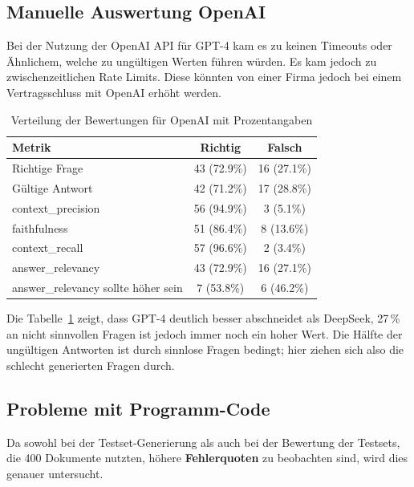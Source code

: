 \subsection{Manuelle Auswertung OpenAI}
Bei der Nutzung der OpenAI API für GPT-4 kam es zu keinen Timeouts oder Ähnlichem, welche zu ungültigen Werten führen würden.
Es kam jedoch zu zwischenzeitlichen Rate Limits.
Diese könnten von einer Firma jedoch bei einem Vertragsschluss mit OpenAI erhöht werden.

\begin{table}[h!]
    \centering
    \caption[OpenAI Verteilung der Bewertungen]{Verteilung der Bewertungen für OpenAI mit Prozentangaben}
    \begin{tabular}{|l|c|c|}
    \hline
    \textbf{Metrik} & \textbf{Richtig} & \textbf{Falsch} \\
    \hline
    Richtige Frage                        & 43 (72.9\%) & 16 (27.1\%) \\
    Gültige Antwort                       & 42 (71.2\%) & 17 (28.8\%) \\
    context\_precision           & 56 (94.9\%) & 3 (5.1\%) \\
    faithfulness                 & 51 (86.4\%) & 8 (13.6\%) \\
    context\_recall              & 57 (96.6\%) & 2 (3.4\%) \\
    answer\_relevancy            & 43 (72.9\%) & 16 (27.1\%) \\
    answer\_relevancy sollte höher sein  & 7 (53.8\%)  & 6 (46.2\%) \\
    \hline
    \end{tabular}
    \label{tab:openai_evaluation}
\end{table}

Die Tabelle~\ref{tab:openai_evaluation} zeigt, dass GPT-4 deutlich besser abschneidet als DeepSeek, 27\,\% an nicht sinnvollen Fragen ist jedoch immer noch ein hoher Wert.
Die Hälfte der ungültigen Antworten ist durch sinnlose Fragen bedingt; hier ziehen sich also die schlecht generierten Fragen durch.

\subsection{Probleme mit Programm-Code}
Da sowohl bei der Testset-Generierung als auch bei der Bewertung der Testsets, die 400 Dokumente nutzten, höhere \textbf{Fehlerquoten} zu beobachten sind, wird dies genauer untersucht.

